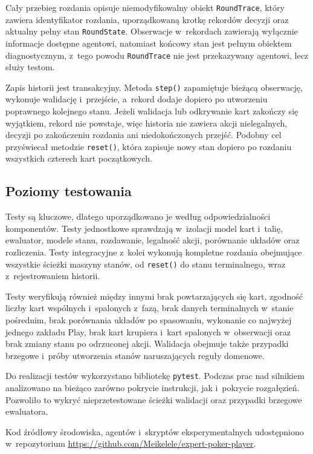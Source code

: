 Cały przebieg rozdania opisuje niemodyfikowalny obiekt \texttt{RoundTrace}, który
zawiera identyfikator rozdania, uporządkowaną krotkę rekordów decyzji oraz
aktualny pełny stan \texttt{RoundState}. Obserwacje w~rekordach zawierają
wyłącznie informacje dostępne agentowi, natomiast końcowy stan jest pełnym
obiektem diagnostycznym, z~tego powodu \texttt{RoundTrace} nie jest
przekazywany agentowi, lecz służy testom.

Zapis historii jest transakcyjny. Metoda \texttt{step()} zapamiętuje bieżącą
obserwację, wykonuje walidację i~przejście, a~rekord dodaje dopiero po
utworzeniu poprawnego kolejnego stanu. Jeżeli walidacja lub odkrywanie kart
zakończy się wyjątkiem, rekord nie powstaje, więc historia nie zawiera akcji
nielegalnych, decyzji po zakończeniu rozdania ani niedokończonych przejść.
Podobny cel przyświecał metodzie \texttt{reset()}, która zapisuje nowy stan
dopiero po rozdaniu wszystkich czterech kart początkowych.

\subsection{Poziomy testowania}
\label{subsec:poziomy-testowania}

Testy są kluczowe, dlatego uporządkowano je według odpowiedzialności komponentów.
Testy jednostkowe
sprawdzają w~izolacji model kart i~talię, ewaluator, modele stanu,
rozdawanie, legalność akcji, porównanie układów oraz rozliczenia. Testy integracyjne z~kolei
wykonują kompletne rozdania obejmujące wszystkie ścieżki maszyny stanów, od
\texttt{reset()} do stanu terminalnego, wraz z~rejestrowaniem historii.

Testy weryfikują również między innymi brak powtarzających się kart,
zgodność liczby kart wspólnych i~spalonych z~fazą, brak danych terminalnych
w~stanie pośrednim, brak porównania układów po spasowaniu, wykonanie co najwyżej
jednego zakładu Play, brak kart krupiera i~kart spalonych w~obserwacji oraz
brak zmiany stanu po odrzuconej akcji. Walidacja obejmuje także
przypadki brzegowe i~próby utworzenia stanów naruszających reguły domenowe.

Do realizacji testów wykorzystano bibliotekę \texttt{pytest}.
Podczas prac nad silnikiem analizowano na bieżąco zarówno pokrycie instrukcji, jak
i~pokrycie rozgałęzień. Pozwoliło to wykryć nieprzetestowane ścieżki
walidacji oraz przypadki brzegowe ewaluatora.

Kod źródłowy środowiska, agentów i~skryptów eksperymentalnych udostępniono
w~repozytorium \url{https://github.com/Meikelele/expert-poker-player}.
